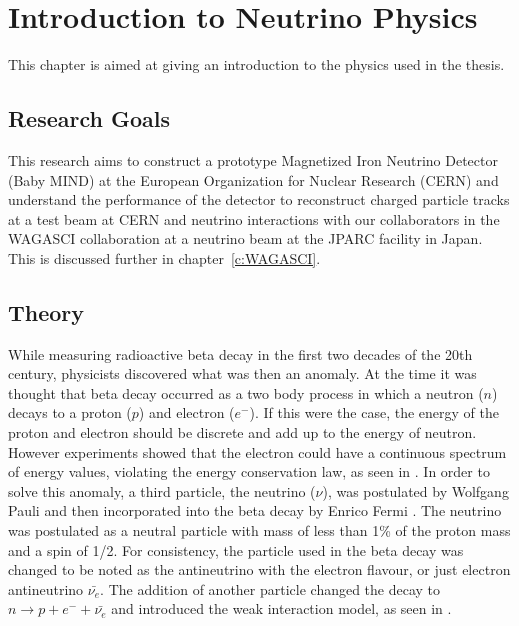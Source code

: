 \chapter{Introduction to Neutrino Physics}
\label{c:theoryIntro}

This chapter is aimed at giving an introduction to the physics used in the thesis.

\section{Research Goals}
This research aims to construct a prototype Magnetized Iron Neutrino Detector (Baby MIND) at the European Organization for Nuclear Research (CERN) and understand the performance of the detector to reconstruct charged particle tracks at a test beam at CERN and neutrino interactions with our collaborators in the WAGASCI collaboration at a neutrino beam at the JPARC facility in Japan. This is discussed further in chapter~\ref{c:WAGASCI}.

\section{Theory}\label{section:Theory}
While measuring radioactive beta decay in the first two decades of the 20th century, physicists discovered what was then an anomaly. At the time it was thought that beta decay occurred as a two body process in which a neutron ($n$) decays to a proton ($p$) and electron ($e^-$). If this were the case, the energy of the proton and electron should be discrete and add up to the energy of neutron. However experiments showed that the electron could have a continuous spectrum of energy values, violating the energy conservation law, as seen in . In order to solve this anomaly, a third particle, the neutrino ($\nu$), was postulated by Wolfgang Pauli \cite{4Pauli:Online} and then incorporated into the beta decay by Enrico Fermi \cite{5Wilson}. The neutrino was postulated as a neutral particle with mass of less than 1\% of the proton mass and a spin of 1/2. For consistency, the particle used in the beta decay was changed to be noted as the antineutrino with the electron flavour, or just electron antineutrino $\bar{\nu_e}$. The addition of another particle changed the decay to $n \rightarrow p + e^- + \bar{\nu_e}$ and introduced the weak interaction model, as seen in . 

